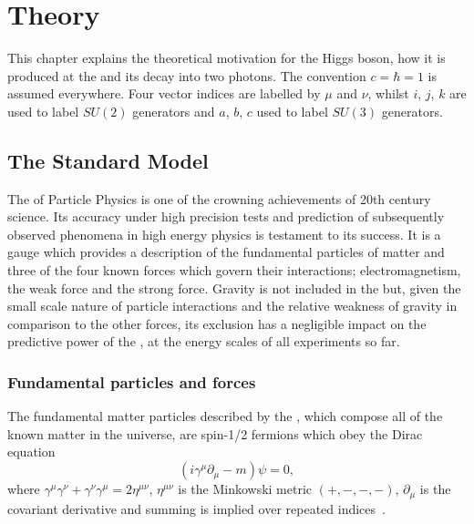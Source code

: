 \chapter{Theory}
\label{chap:theory}

This chapter explains the theoretical motivation for the Higgs boson, how it is produced at the \LHC and its decay into two photons. The convention $c=\hbar=1$ is assumed everywhere. Four vector indices are labelled by $\mu$ and $\nu$, whilst $i$, $j$, $k$ are used to label $SU(2)$ generators and $a$, $b$, $c$ used to label $SU(3)$ generators.

\section{The Standard Model}
\label{sec:standardmodel}

The \SM of Particle Physics is one of the crowning achievements of 20th century science. Its accuracy under high precision tests and prediction of subsequently observed phenomena in high energy physics is testament to its success. It is a gauge \QFT which provides a description of the fundamental particles of matter and three of the four known forces which govern their interactions; electromagnetism, the weak force and the strong force. Gravity is not included in the \SM but, given the small scale nature of particle interactions and the relative weakness of gravity in comparison to the other forces, its exclusion has a negligible impact on the predictive power of the \SM, at the energy scales of all experiments so far. 

\subsection{Fundamental particles and forces}

The fundamental matter particles described by the \SM, which compose all of the known matter in the universe, are spin-1/2 fermions which obey the Dirac equation
\begin{equation}
  (i\gamma^{\mu}\partial_{\mu}-m)\psi=0,
  \label{eq:dirac}
\end{equation}
where $\gamma^{\mu}\gamma^{\nu}+\gamma^{\nu}\gamma^{\mu}=2\eta^{\mu\nu}$, $\eta^{\mu\nu}$ is the Minkowski metric $(+,-,-,-)$, $\partial_{\mu}$ is the covariant derivative and summing is implied over repeated indices~\cite{Halzen}.

